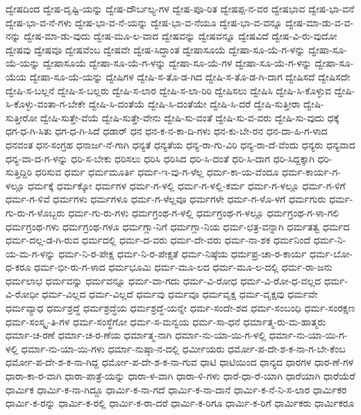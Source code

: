 {ದ್ವೇಷದಿಂದ
ದ್ವೇಷ-ದೃಷ್ಟಿ-ಯನ್ನು
ದ್ವೇಷ-ದೌರ್ಬಲ್ಯ-ಗಳ
ದ್ವೇಷ-ಪೂ-ರಿತ
ದ್ವೇಷಪ್ಪ-ನ-ವರ
ದ್ವೇಷಭಾವ
ದ್ವೇಷ-ಭಾ-ವನೆ
ದ್ವೇಷ-ಭಾ-ವ-ನೆ-ಗಳು
ದ್ವೇಷ-ಭಾ-ವ-ನೆ-ಯನ್ನು
ದ್ವೇಷ-ಭಾ-ವ-ನೆಯೂ
ದ್ವೇಷ-ಭಾ-ವ-ವನ್ನೂ
ದ್ವೇಷ-ಮಾ-ಡು-ವ-ವ-ನನ್ನು
ದ್ವೇಷ-ಮಾ-ಡು-ವುದು
ದ್ವೇಷ-ಮೂ-ಲ-ವಾದ
ದ್ವೇಷವನ್ನು
ದ್ವೇಷವನ್ನೂ
ದ್ವೇಷವಿದೆ
ದ್ವೇಷ-ವಿ-ರು-ವುದೋ
ದ್ವೇಷವು
ದ್ವೇಷವೂ
ದ್ವೇಷವೆಂಬ
ದ್ವೇಷವೇ
ದ್ವೇಷ-ಸಿದ್ಧಾಂತ
ದ್ವೇಷಾಸೂಯೆ
ದ್ವೇಷಾ-ಸೂ-ಯೆ-ಗ-ಳನ್ನು
ದ್ವೇಷಾ-ಸೂ-ಯೆ-ಯನ್ನು
ದ್ವೇಷಾಸೂಯೆ
ದ್ವೇಷಾ-ಸೂ-ಯೆ-ಗ-ಳನ್ನು
ದ್ವೇಷಾ-ಸೂ-ಯೆ-ಗಳ
ದ್ವೇಷಾ-ಸೂ-ಯೆ-ಗ-ಳನ್ನು
ದ್ವೇಷಾ-ಸೂ-ಯೆಯ
ದ್ವೇಷಾ-ಸೂ-ಯೆ-ಯನ್ನು
ದ್ವೇಷಿಗಳ
ದ್ವೇಷಿ-ಸ-ತೊ-ಡ-ಗಿದ
ದ್ವೇಷಿ-ಸ-ತೊ-ಡ-ಗಿ-ದಾಗ
ದ್ವೇಷಿಸದೆ
ದ್ವೇಷಿಸದೇ
ದ್ವೇಷಿ-ಸ-ಬಲ್ಲನೆ
ದ್ವೇಷಿ-ಸ-ಬಲ್ಲರು
ದ್ವೇಷಿ-ಸ-ಲಾರ
ದ್ವೇಷಿ-ಸ-ಲಾ-ರಿರಿ
ದ್ವೇಷಿಸಲು
ದ್ವೇಷಿಸಿ
ದ್ವೇಷಿ-ಸಿ-ಕೊಳ್ಳುವ
ದ್ವೇಷಿ-ಸಿ-ಕೊಳ್ಳು-ವಂತಾ-ಗ-ಬೇಕೇ
ದ್ವೇಷಿ-ಸಿ-ದಂತೆಯೆ
ದ್ವೇಷಿ-ಸಿ-ದಂತೆಯೇ
ದ್ವೇಷಿ-ಸಿ-ದರೆ
ದ್ವೇಷಿ-ಸುತ್ತೀರಾ
ದ್ವೇಷಿ-ಸುತ್ತೀರೋ
ದ್ವೇಷಿ-ಸುತ್ತೇ-ವೆಯೆ
ದ್ವೇಷಿ-ಸುತ್ತೇ-ವೇನು
ದ್ವೇಷಿ-ಸು-ವಂತೆ
ದ್ವೇಷಿ-ಸು-ವ-ವರು
ದ್ವೇಷಿ-ಸು-ವುದು
ಧಕ್ಕೆ
ಧಗ-ಧ-ಗಿ-ಸಿತು
ಧಗ-ಧ-ಗಿ-ಸಿದೆ
ಧಡಾರ್
ಧನ
ಧನ-ಕ-ನ-ಕಾ-ದಿ-ಗಳು
ಧನ-ಕು-ಬೇ-ರನ
ಧನ-ದಾ-ಹಿ-ಗ-ಳಾದ
ಧನವಂತ
ಧನ-ಸಂಗ್ರಹ
ಧನಾರ್ಜ-ನೆ-ಗಾಗಿ
ಧನ್ಯತೆ
ಧನ್ಯತೆಯ
ಧನ್ಯ-ರಾ-ಗು-ವಿರಿ
ಧನ್ಯ-ರಾ-ದೆ-ವೆಂದು
ಧನ್ಯರು
ಧನ್ಯವಾದ
ಧನ್ಯ-ವಾ-ದ-ಗ-ಳನ್ನು
ಧರಿ-ಸ-ಬೇಕು
ಧರಿಸಲು
ಧರಿಸಿ
ಧರಿಸಿದ
ಧರಿ-ಸಿ-ದಂತೆ
ಧರಿ-ಸಿ-ದಾಗ
ಧರಿ-ಸಿದ್ದಕ್ಕಾಗಿ
ಧರಿ-ಸುತ್ತಿದ್ದಿರಿ
ಧರಿಸುವ
ಧರ್ಮ
ಧರ್ಮಮೂರ್ತಿ
ಧರ್ಮ-ಇ-ವು-ಗ-ಳೆಲ್ಲ
ಧರ್ಮ-ಕಾ-ಯ-ವೆಂದೂ
ಧರ್ಮ-ಕಾರ್ಯ-ಗ-ಳಲ್ಲೂ
ಧರ್ಮಕ್ಕೆ
ಧರ್ಮಕ್ಕೋ
ಧರ್ಮಗಳ
ಧರ್ಮ-ಗ-ಳಲ್ಲಿ
ಧರ್ಮ-ಗ-ಳಲ್ಲಿ-ಕರ್ಮ
ಧರ್ಮ-ಗ-ಳಲ್ಲೂ
ಧರ್ಮ-ಗ-ಳಿಗೆ
ಧರ್ಮ-ಗ-ಳಿವೆ
ಧರ್ಮಗಳು
ಧರ್ಮಗಳೂ
ಧರ್ಮ-ಗ-ಳೆಲ್ಲವೂ
ಧರ್ಮಗಳೇ
ಧರ್ಮ-ಗ-ಳೊ-ಳಗೆ
ಧರ್ಮಗುರು
ಧರ್ಮ-ಗು-ರು-ಗ-ಳೊಬ್ಬರು
ಧರ್ಮ-ಗು-ರು-ಗಳು
ಧರ್ಮಗ್ರಂಥ-ಗ-ಳಲ್ಲಿ
ಧರ್ಮಗ್ರಂಥ-ಗ-ಳಲ್ಲೂ
ಧರ್ಮಗ್ರಂಥ-ಗ-ಳಾ-ಗಲಿ
ಧರ್ಮಗ್ರಂಥ-ಗಳು
ಧರ್ಮಗ್ರಂಥ-ಗಳೂ
ಧರ್ಮಗ್ಲಾ-ನಿಗೆ
ಧರ್ಮಗ್ಲಾ-ನಿಯ
ಧರ್ಮ-ಛತ್ರ-ವನ್ನಾಗಿ
ಧರ್ಮತತ್ವ
ಧರ್ಮದ
ಧರ್ಮ-ದಲ್ಲ-ಡ-ಗಿ-ರುವ
ಧರ್ಮದಲ್ಲಿ
ಧರ್ಮ-ದ-ವರು
ಧರ್ಮ-ದೇ-ವರು
ಧರ್ಮ-ನಾ-ಶಕ
ಧರ್ಮನಿಂದೆ
ಧರ್ಮ-ನಿ-ಯ-ಮ-ಗ-ಳನ್ನು
ಧರ್ಮ-ನಿ-ರ-ಪೇಕ್ಷ
ಧರ್ಮ-ನಿ-ರ-ಪೇಕ್ಷತೆ
ಧರ್ಮ-ನಿಷ್ಠೆಯ
ಧರ್ಮಪ್ರ-ಚಾ-ರ-ಕಾರ್ಯ
ಧರ್ಮ-ಬೋ-ಧ-ಕರೂ
ಧರ್ಮ-ಭೀ-ರು-ಗ-ಳಾದ
ಧರ್ಮಭೂಮಿ
ಧರ್ಮ-ಮೂ-ಲದ
ಧರ್ಮ-ಮೂ-ಲ-ದಲ್ಲಿ
ಧರ್ಮ-ರಾ-ಜನು
ಧರ್ಮಲಾಭ
ಧರ್ಮವನ್ನು
ಧರ್ಮವನ್ನೂ
ಧರ್ಮ-ವಾ-ಗದು
ಧರ್ಮ-ವಿ-ರೋಧ
ಧರ್ಮ-ವಿ-ರೋ-ಧ-ವಲ್ಲದ
ಧರ್ಮ-ವಿ-ರೋಧೀ
ಧರ್ಮ-ವಿಲ್ಲದ
ಧರ್ಮ-ವಿಲ್ಲದೆ
ಧರ್ಮವು
ಧರ್ಮವೂ
ಧರ್ಮವೃಕ್ಷ
ಧರ್ಮ-ವೃಕ್ಷವು
ಧರ್ಮವೇ
ಧರ್ಮವ್ಯಾಧ
ಧರ್ಮಶ್ರದ್ಧೆ
ಧರ್ಮಶ್ರದ್ಧೆಯ
ಧರ್ಮಶ್ರದ್ಧೆ-ಯನ್ನೇ
ಧರ್ಮ-ಸಂದೇ-ಶದ
ಧರ್ಮ-ಸಂಬಂಧಿ
ಧರ್ಮ-ಸಂರಕ್ಷಣ
ಧರ್ಮ-ಸಂಸ್ಕೃ-ತಿ-ಗಳ
ಧರ್ಮ-ಸಂಸ್ಥೆಗೋ
ಧರ್ಮ-ಸ-ಮನ್ವಯ
ಧರ್ಮ-ಸಾ-ಧನೆ
ಧರ್ಮಾತ್ಮ-ರು-ಮ-ಹಾತ್ಮರು
ಧರ್ಮಾ-ಚ-ರಣೆ
ಧರ್ಮಾ-ಚ-ರ-ಣೆಯ
ಧರ್ಮಾತ್ಮ-ನಾಗಿ
ಧರ್ಮಾ-ನು-ಯಾ-ಯಿ-ಗ-ಳಲ್ಲಿ
ಧರ್ಮಾ-ನು-ಯಾ-ಯಿ-ಗ-ಳಲ್ಲಿ
ಧರ್ಮಾ-ನು-ಯಾ-ಯಿ-ಗಳು
ಧರ್ಮಾ-ನುಷ್ಠಾ-ನ-ದಲ್ಲಿ
ಧರ್ಮೀಯರು
ಧರ್ಮೋ-ಪ-ದೇ-ಶ-ಕ-ನಾ-ಗ-ಬೇ-ಕೆಂಬ
ಧರ್ಮೋ-ಪ-ದೇ-ಶ-ಕ-ನಾ-ಗಿದ್ದ
ಧರ್ಮೋ-ಪ-ದೇ-ಶ-ಕ-ನಾ-ಗುವ
ಧಾಟಿ
ಧಾಟಿಯಿಂದ
ಧಾನ್ಯದ
ಧಾರಗಳ
ಧಾರ-ಣೆ-ಗಳ
ಧಾರಾ-ಕಾ-ರ-ವಾಗಿ
ಧಾರಾ-ಪಾತ್ರೆ-ಯನ್ನು
ಧಾರಾ-ಳ-ವಾಗಿ
ಧಾರಾ-ಳಿ-ಗಳು
ಧಾರೆ-ಧಾ-ರೆ-ಯಾಗಿ
ಧಾರೆಯಾಗಿ
ಧಾರೆಯೆರೆ
ಧಾರ್ಮಿಕ
ಧಾರ್ಮಿ-ಕ-ನಾ-ಗಿದ್ದೂ
ಧಾರ್ಮಿ-ಕ-ನಾ-ಗದೆ
ಧಾರ್ಮಿ-ಕ-ನಾ-ದಾನೆ
ಧಾರ್ಮಿ-ಕ-ನೆ-ನಿ-ಸ-ಲಾರ
ಧಾರ್ಮಿಕರ
ಧಾರ್ಮಿ-ಕ-ರನ್ನು
ಧಾರ್ಮಿ-ಕ-ರಲ್ಲಿ
ಧಾರ್ಮಿ-ಕ-ರಾ-ದರೆ
ಧಾರ್ಮಿ-ಕ-ರಿಗೂ
ಧಾರ್ಮಿ-ಕ-ರಿಗೆ
ಧಾರ್ಮಿಕರು
ಧಾರ್ಮಿಕರೂ
}
